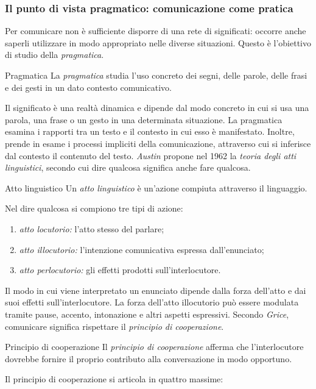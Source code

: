 \documentclass[a4paper]{article}
\begin{document}
\subsubsection{Il punto di vista pragmatico: comunicazione come pratica}
Per comunicare non è sufficiente disporre di una rete di significati: occorre anche saperli utilizzare in modo appropriato nelle diverse situazioni. Questo è l'obiettivo di studio della \emph{pragmatica}.
\begin{snippetdefinition}{Pragmatica}
    La \emph{pragmatica} studia l'uso concreto dei segni, delle parole, delle frasi e dei gesti in un dato contesto comunicativo.
\end{snippetdefinition}
Il significato è una realtà dinamica e dipende dal modo concreto in cui si usa una parola, una frase o un gesto in una determinata situazione.
La pragmatica esamina i rapporti tra un testo e il contesto in cui esso è manifestato. Inoltre, prende in esame i processi impliciti della comunicazione, attraverso cui si inferisce dal contesto il contenuto del testo.
\emph{Austin} propone nel 1962 la \emph{teoria degli atti linguistici}, secondo cui dire qualcosa significa anche fare qualcosa.
\begin{snippetdefinition}{Atto linguistico}
    Un \emph{atto linguistico} è un'azione compiuta attraverso il linguaggio.
\end{snippetdefinition}
Nel dire qualcosa si compiono tre tipi di azione:
\begin{enumerate}
    \item \emph{atto locutorio:} l'atto stesso del parlare;
    \item \emph{atto illocutorio:} l'intenzione comunicativa espressa dall'enunciato;
    \item \emph{atto perlocutorio:} gli effetti prodotti sull'interlocutore.
\end{enumerate}
Il modo in cui viene interpretato un enunciato dipende dalla forza dell'atto e dai suoi effetti sull'interlocutore. La forza dell'atto illocutorio può essere modulata tramite pause, accento, intonazione e altri aspetti espressivi.
Secondo \emph{Grice}, comunicare significa rispettare il \emph{principio di cooperazione}.
\begin{snippetdefinition}{Principio di cooperazione}
    Il \emph{principio di cooperazione} afferma che l'interlocutore dovrebbe fornire il proprio contributo alla conversazione in modo opportuno.
\end{snippetdefinition}
Il principio di cooperazione si articola in quattro massime:
\end{document}
